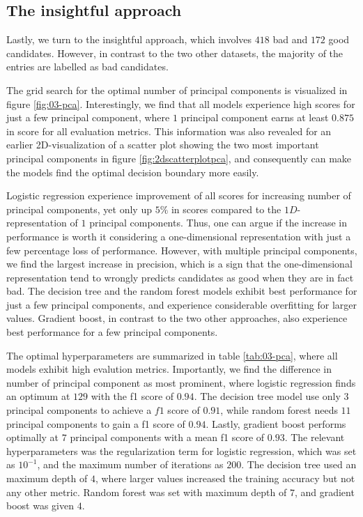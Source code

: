 \subsection{The insightful approach}

Lastly, we turn to the insightful approach, which involves $418$ bad and $172$ good candidates. However, in contrast to the two other datasets, the majority of the entries are labelled as bad candidates.

The grid search for the optimal number of principal components is visualized in figure \ref{fig:03-pca}. Interestingly, we find that all models experience high scores for just a few principal component, where $1$ principal component earns at least $0.875$ in score for all evaluation metrics. This information was also revealed for an earlier 2D-visualization of a scatter plot showing the two most important principal components in figure \ref{fig:2dscatterplotpca}, and consequently can make the models find the optimal decision boundary more easily.

Logistic regression experience improvement of all scores for increasing number of principal components, yet only up $5\%$ in scores compared to the $1D$-representation of $1$ principal components. Thus, one can argue if the increase in performance is worth it considering a one-dimensional representation with just a few percentage loss of performance. However, with multiple principal components, we find the largest increase in precision, which is a sign that the one-dimensional representation tend to wrongly predicts candidates as good when they are in fact bad. The decision tree and the random forest models exhibit best performance for just a few principal components, and experience considerable overfitting for larger values. Gradient boost, in contrast to the two other approaches, also experience best performance for a few principal components.

The optimal hyperparameters are summarized in table \ref{tab:03-pca}, where all models exhibit high evalution metrics. Importantly, we find the difference in number of principal component as most prominent, where logistic regression finds an optimum at $129$ with the f1 score of $0.94$. The decision tree model use only $3$ principal components to achieve a $f1$ score of $0.91$, while random forest needs $11$ principal components to gain a f1 score of $0.94$. Lastly, gradient boost performs optimally at $7$ principal components with a mean f1 score of $0.93$. The relevant hyperparameters was the regularization term for logistic regression, which was set as $10^{-1}$, and the maximum number of iterations as $200$. The decision tree used an maximum depth of $4$, where larger values increased the training accuracy but not any other metric. Random forest was set with maximum depth of $7$, and gradient boost was given $4$.

